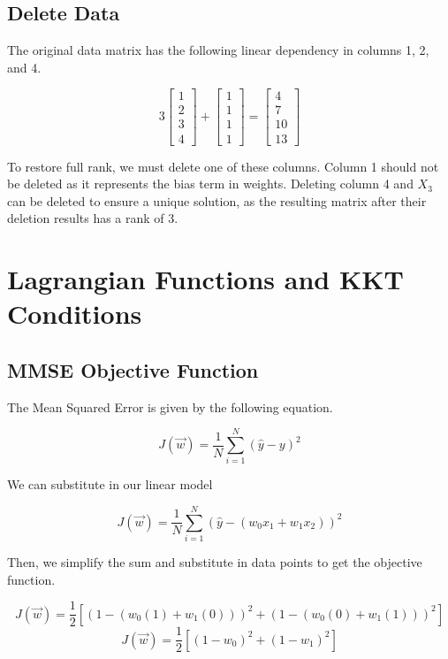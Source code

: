 \documentclass{article}
\begin{document}
\subsection{Delete Data}
The original data matrix has the following linear dependency in columns 1, 2, and 4.

\[3 \begin{bmatrix}
    1 \\
    2 \\
    3 \\
    4 
\end{bmatrix} + \begin{bmatrix}
    1 \\
    1 \\
    1 \\
    1 
\end{bmatrix} = 
\begin{bmatrix}
    4 \\
    7 \\
    10 \\
    13
\end{bmatrix}
\]

\noindent
To restore full rank, we must delete one of these columns. Column 1 should not be deleted as it represents the bias term in weights. Deleting column 4 and $X_3$ can be deleted to ensure a unique solution, as the resulting matrix after their deletion results has a rank of 3.

\section{Lagrangian Functions and KKT Conditions}
\subsection{MMSE Objective Function}

The Mean Squared Error is given by the following equation.

\[J(\Vec{w}) = \frac{1}{N} \sum^N_{i=1}(\hat{y} - y)^2\]

We can substitute in our linear model

\[J(\Vec{w}) = \frac{1}{N} \sum^N_{i=1}(\hat{y} - (w_0x_1 + w_1x_2))^2\]

Then, we simplify the sum and substitute in data points to get the objective function.

\[J(\Vec{w}) = \frac{1}{2} [(1 - (w_0(1) + w_1(0)))^2 + (1 - (w_0(0) + w_1(1)))^2]    \]
\[J(\Vec{w}) = \frac{1}{2} [(1 - w_0)^2 + (1 - w_1)^2]    \]
\end{document}
